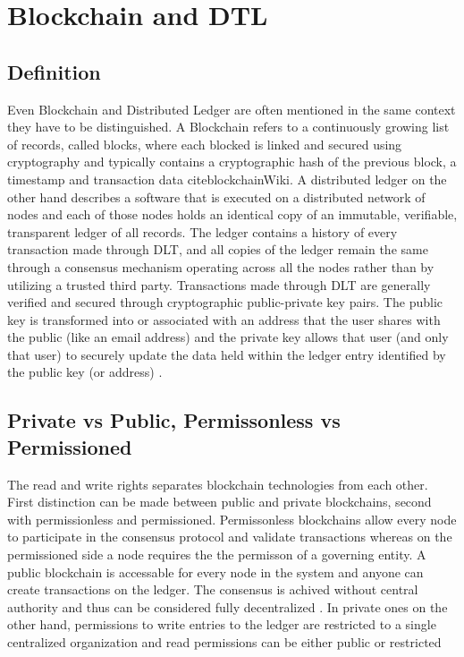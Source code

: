 \section{Blockchain and DTL}
\subsection{Definition}
Even Blockchain and Distributed Ledger are often mentioned in the same context they have to be distinguished. 
A Blockchain refers to a continuously growing list of records, called blocks, where each blocked is linked and secured using cryptography and typically contains a cryptographic hash of the previous block, a timestamp and transaction data cite{blockchainWiki}. 
A distributed ledger on the other hand describes a software that is executed on a distributed network of nodes and each of those nodes holds an identical copy of an immutable, verifiable, transparent ledger of all records. The ledger contains a history of every transaction made through DLT, and all copies of the ledger remain the same through a consensus mechanism operating across all the nodes rather than by utilizing a trusted third party. Transactions made through DLT are generally verified and secured through cryptographic public-private key pairs. The public key is transformed into or associated with an address that the user shares with the public (like an email address) and the private key allows that user (and only that user) to securely update the data held within the ledger entry identified by the public key (or address) \cite{dlt}. 

\subsection{Private vs Public, Permissonless vs Permissioned}

The read and write rights separates blockchain technologies from each other.
First distinction can be made between public and private blockchains, second with permissionless and permissioned.
Permissonless blockchains allow every node to participate in the consensus protocol and validate transactions whereas on the permissioned side a node requires the the permisson of a governing entity.\cite{dlt}
A public blockchain is accessable for every node in the system and anyone can create transactions on the ledger. The consensus is achived without central authority and thus can be considered fully decentralized \cite{publicBlockchain}. In private ones on the other hand, permissions to write entries to the ledger are restricted to a single centralized organization and read permissions can be either public or restricted\cite{dlt}

